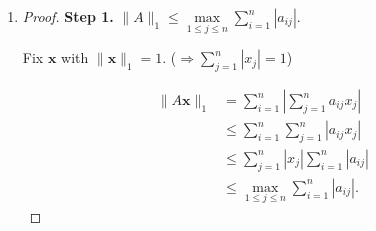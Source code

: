 \documentclass[12pt]{article}
\begin{document}
\begin{enumerate}[leftmargin=0em]
\begin{enumerate}[leftmargin=!]
        \item

        \begin{proof}
            Note that by part $(a)$, we have that for any vector $x\neq 0$,
            \[||A|| = \max_{y\neq 0}\frac{||Ay||}{||y||} \geq \frac{||Ax||}{||x||}.\]
            Multiplying by $||x||$ gives that $||Ax||\leq ||A||||x||$ for all $x\neq 0$. Furthermore, note that the inequality also holds when $x=0$, since $Ax=0$. Therefore,
            \[||Ax||\leq ||A||||x||\]
            for all $x$. We then have that
            \[||AB|| = \max_{||x||=1||}||ABx||  \leq \max_{||x||=1}||A||||Bx||=||A||\max_{||x||=1}||Bx||= ||A||||B||\]
            which is the desired result.
        \end{proof}
        
        \item 
        \begin{proof}
            By repetedly applying part $(b)$, we have that for all $k\in \NN$ 
            \[||A^k||= ||A\cdot A^{k-1}||\leq ||A||||A^{k-1}|| =||A||||A\cdot A^{k-2}|| \leq {||A||}^2||A^{k-2}|| \leq \ldots ||A||^{k}.\]
        \end{proof}
        
        \item 
        \begin{proof}
            Note that by part $(b)$, we have
            \[||A||||A^{-1}|| \geq ||AA^{-1}|| = ||I|| = \max_{||x||=1}||Ix|| = \max_{||x||=1}||x|| = 1\]
            which is the desired result.
        \end{proof}
    \end{enumerate}

    \item 
    \begin{proof}
	    
	\textbf{Step 1.} $\|A\|_1 \leq \max\limits_{1 \leq j \leq n} \sum\limits_{i=1}^{n} |a_{ij}|.$
	
	Fix $\mathbf{x}$ with $\|\mathbf{x}\|_1 = 1$. \quad ($\Rightarrow \sum\limits_{j=1}^{n} |x_j| = 1$)
	
	\begin{align*}
		\|A\mathbf{x}\|_1 & = \sum\limits_{i=1}^{n} \left| \sum\limits_{j=1}^{n} a_{ij} x_j \right| \\
		                  & \leq \sum\limits_{i=1}^{n} \sum\limits_{j=1}^{n} |a_{ij} x_j|           \\
		                  & \leq \sum\limits_{j=1}^{n} |x_j| \sum\limits_{i=1}^{n} |a_{ij}|         \\
		                  & \leq \max\limits_{1 \leq j \leq n} \sum\limits_{i=1}^{n} |a_{ij}|.      
	\end{align*}
	

\end{proof}
\end{enumerate}
\end{document}
